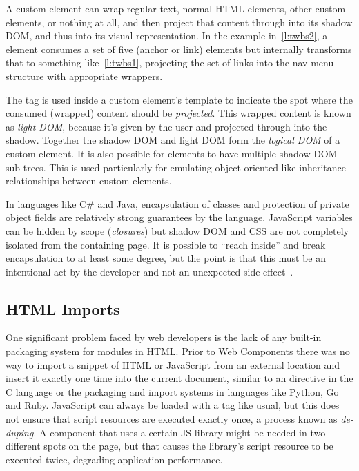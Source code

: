 A custom element can wrap regular text, normal HTML elements, other custom elements, or nothing at all,
and then project that content through into its shadow DOM, 
and thus into its visual representation.
In the example in~\cref{l:twbs2}, 
a \textbf{} element consumes a set of five 
\textbf{} (anchor or link) elements but internally transforms that to something like~\cref{l:twbs1}, 
projecting the set of links into the nav menu structure with appropriate wrappers.

The  tag is used inside a custom element's template to indicate the spot where the consumed (wrapped) content should be \textit{projected}. 
This wrapped content is known as 
\textit{light DOM}, 
because it's given by the user and projected through into the shadow.
Together the shadow DOM and light DOM form the \textit{logical DOM} of a custom element.
It is also possible for elements to have multiple shadow DOM sub-trees. 
This is used particularly for emulating object-oriented-like inheritance relationships between custom elements.

In languages like C\# and Java, encapsulation of classes and protection of private object fields are relatively strong guarantees by the language.
JavaScript variables can be hidden by scope (\textit{closures})
but shadow DOM and CSS are not completely isolated from the containing page.
It is possible to ``reach inside'' and break encapsulation to at least some degree, 
but the point is that this must be an intentional act by the developer and not an unexpected side-effect~\cite{bidelman2014}.

\subsection{HTML Imports}
One significant problem faced by web developers is the lack of any built-in packaging system for modules in HTML.
Prior to Web Components there was no way to import a snippet of HTML or JavaScript from an external location and insert it exactly one time into the current document, 
similar to an  directive in the C language or the packaging and import systems in languages
like Python, Go and Ruby. 
JavaScript can always be loaded with a  tag like usual, but this does not ensure that script resources are executed exactly once, a process known as \textit{de-duping}.
A component that uses a certain JS library might be needed in two different spots on the page, 
but that causes the library's script resource to be executed twice, degrading application performance.

